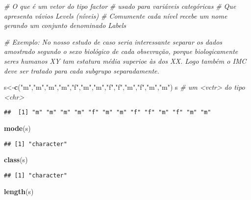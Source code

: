 \documentclass[]{article}
\newenvironment{Shaded}{\begin{snugshade}}{\end{snugshade}}
\newcommand{\KeywordTok}[1]{\textcolor[rgb]{0.13,0.29,0.53}{\textbf{#1}}}
\newcommand{\StringTok}[1]{\textcolor[rgb]{0.31,0.60,0.02}{#1}}
\newcommand{\CommentTok}[1]{\textcolor[rgb]{0.56,0.35,0.01}{\textit{#1}}}
\newcommand{\NormalTok}[1]{#1}
\begin{document}
\begin{Shaded}
\begin{Highlighting}[]
\CommentTok{# O que é um vetor do tipo factor}
\CommentTok{# usado para variáveis categóricas}
\CommentTok{# Que apresenta vávios Levels (níveis)}
\CommentTok{# Comumente cada nível recebe um nome gerando um conjunto denominado Labels}

\CommentTok{# Exemplo: No nosso estudo de caso seria interessante separar os dados amostrado segundo o sexo biológico de cada obsevração, porque biologicamente seres humanos XY tam estatura média superioe às dos XX. Logo também o IMC deve ser tratado para cada subgrupo separadamente.}

\NormalTok{s<-}\KeywordTok{c}\NormalTok{(}\StringTok{"m"}\NormalTok{,}\StringTok{"m"}\NormalTok{,}\StringTok{"m"}\NormalTok{,}\StringTok{"m"}\NormalTok{,}\StringTok{"f"}\NormalTok{,}\StringTok{"m"}\NormalTok{,}\StringTok{"m"}\NormalTok{,}\StringTok{"f"}\NormalTok{,}\StringTok{"f"}\NormalTok{,}\StringTok{"m"}\NormalTok{,}\StringTok{"f"}\NormalTok{,}\StringTok{"m"}\NormalTok{,}\StringTok{"m"}\NormalTok{)}
\NormalTok{s }\CommentTok{# um <vctr> do tipo <chr>}
\end{Highlighting}
\end{Shaded}

\begin{verbatim}
##  [1] "m" "m" "m" "m" "f" "m" "m" "f" "f" "m" "f" "m" "m"
\end{verbatim}

\begin{Shaded}
\begin{Highlighting}[]
\KeywordTok{mode}\NormalTok{(s)}
\end{Highlighting}
\end{Shaded}

\begin{verbatim}
## [1] "character"
\end{verbatim}

\begin{Shaded}
\begin{Highlighting}[]
\KeywordTok{class}\NormalTok{(s)}
\end{Highlighting}
\end{Shaded}

\begin{verbatim}
## [1] "character"
\end{verbatim}

\begin{Shaded}
\begin{Highlighting}[]
\KeywordTok{length}\NormalTok{(s)}
\end{Highlighting}
\end{Shaded}
\end{document}
